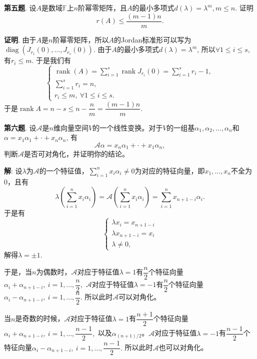 \newpageorvspace


{\bf 第五题}. 设$A$是数域$\mathbb{F}$上$n$阶幂零矩阵，且$A$的最小多项式$d(\lambda) = \lambda^m, m\leqslant n$. 证明
$$r(A) \leqslant \dfrac{(m-1)n}{m}.$$

{\bf 证明}. 由于$A$是$n$阶幂零矩阵，所以$A$的Jordan标准形可以写为$\operatorname{diag}(J_{r_1}(0), \ldots, J_{r_s}(0))$. 由于$A$的最小多项式$d(\lambda) = \lambda^m$, 所以$\forall 1 \leqslant i \leqslant s$, 有$r_i \leqslant m$. 于是我们有
$$
\begin{cases}
\operatorname{rank}(A) = \sum\limits_{i=1}^s \operatorname{rank} J_{r_i}(0) = \sum\limits_{i=1}^s r_i - 1, \\
\sum\limits_{i=1}^s r_i = n, \\
r_i \leqslant m, ~ \forall 1 \leqslant i \leqslant s.
\end{cases}
$$
于是$\operatorname{rank} A = n - s \leqslant n - \dfrac{n}{m} = \dfrac{(m-1)n}{m}$.


\newpageorvspace


{\bf 第六题}. 设$\mathscr{A}$是$n$维向量空间$V$的一个线性变换。对于$V$的一组基$\alpha_1, \alpha_2, \ldots, \alpha_n$和$\alpha = x_1\alpha_1 + \cdot + x_n\alpha_n$, 有
$$\mathscr{A}\alpha = x_n\alpha_1 + \cdot + x_1\alpha_n,$$
判断$\mathscr{A}$是否可对角化，并证明你的结论。

{\bf 解}: 设$\lambda$为$\mathscr{A}$的一个特征值，$\sum\limits_{i=1}^n x_i \alpha_i \neq 0$为对应的特征向量，即$x_1,\ldots,x_n$不全为0，且有
$$\lambda(\sum\limits_{i=1}^n x_i \alpha_i) = \mathscr{A}(\sum\limits_{i=1}^n x_i \alpha_i) = \sum\limits_{i=1}^n x_{n+1-i} \alpha_i.$$
于是有
$$
\begin{cases}
\lambda x_i = x_{n+1-i} \\
\lambda x_{n+1-i} = x_i \\
\lambda \neq 0,
\end{cases}
$$
解得$\lambda = \pm 1$. 

于是，当$n$为偶数时，$\mathscr{A}$对应于特征值$\lambda = 1$有$\dfrac{n}{2}$个特征向量$\alpha_i + \alpha_{n+1-i}, ~ i = 1, \ldots, \dfrac{n}{2},$ $\mathscr{A}$对应于特征值$\lambda = -1$有$\dfrac{n}{2}$个特征向量$\alpha_i - \alpha_{n+1-i}, ~ i = 1, \ldots, \dfrac{n}{2}.$ 所以此时$\mathscr{A}$可以对角化。

当$n$是奇数的时候，$\mathscr{A}$对应于特征值$\lambda = 1$有$\dfrac{n+1}{2}$个特征向量$\alpha_i + \alpha_{n+1-i}, ~ i = 1, \ldots, \dfrac{n-1}{2},$ 以及$\alpha_{(n+1)/2}$。$\mathscr{A}$对应于特征值$\lambda = -1$有$\dfrac{n-1}{2}$个特征向量$\alpha_i - \alpha_{n+1-i}, ~ i = 1, \ldots, \dfrac{n-1}{2}.$ 所以此时$\mathscr{A}$也可以对角化。

